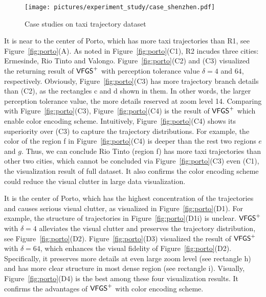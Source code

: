\begin{figure*}[t]
	\centering
	\texttt{[image: pictures/experiment\_study/case\_shenzhen.pdf]}
	\caption{Case studies on \sz{} taxi trajectory dataset}
	\label{fig:shenzhen}
    \vspace{-4mm}
\end{figure*}

 It is near to the center of Porto, which has more taxi trajectories than R1, see Figure~\ref{fig:porto}(A).
As noted in Figure~\ref{fig:porto}(C1), R2 incudes three cities: Ermesinde, Rio Tinto and Valongo.
Figure~\ref{fig:porto}(C2) and (C3) visualized the returning result of $\mathsf{VFGS}^{+}$ with perception tolerance value $\delta=4$ and $64$, respectively.
Obviously, Figure~\ref{fig:porto}(C3) has more trajectory branch details than (C2), as the rectangles c and d shown in them.
In other words, the larger perception tolerance value, the more details reserved at zoom level 14.
Comparing with Figure~\ref{fig:porto}(C3), Figure~\ref{fig:porto}(C4) is the result of $\mathsf{VFGS}^{+}$ which enable color encoding scheme.
Intuitively, Figure~\ref{fig:porto}(C4) shows its superiority over (C3) to capture the trajectory distributions.
For example, the color of the region f in Figure~\ref{fig:porto}(C4) is deeper than the rest two regions $e$ and $g$.
Thus, we can conclude Rio Tinto (region f) has more taxi trajectories than other two cities, which cannot be concluded via Figure~\ref{fig:porto}(C3) even (C1), the visualization result of full dataset.
It also confirms the color encoding scheme could reduce the visual clutter in large data visualization.

 It is the center of Porto, which has the highest concentration of the trajectories and causes serious visual clutter, as visualized in Figure~\ref{fig:porto}(D1).
For example, the structure of trajectories in Figure~\ref{fig:porto}(D1i) is unclear.
$\mathsf{VFGS}^{+}$ with $\delta=4$ alleviates the visual clutter and preserves the trajectory distribution, see Figure~\ref{fig:porto}(D2).
Figure~\ref{fig:porto}(D3) visualized the result of $\mathsf{VFGS}^{+}$ with $\delta=64$, which enhances the visual fidelity of Figure~\ref{fig:porto}(D2).
Specifically, it preserves more details at even large zoom level (see rectangle h) and has more clear structure in most dense region (see rectangle i).
Visually, Figure~\ref{fig:porto}(D4) is the best among these four visualization results.
It confirms the advantages of $\mathsf{VFGS}^{+}$ with color encoding scheme.


